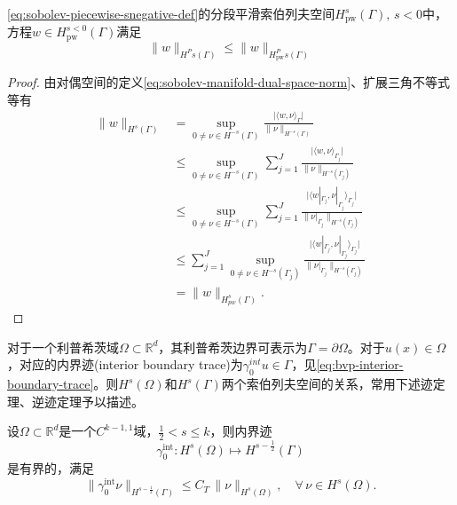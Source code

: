 \begin{lemma}
  \eqref{eq:sobolev-piecewise-snegative-def}的分段平滑索伯列夫空间$H^{s}_{\text{pw}}(\Gamma), \, s<0$中，方程$w \in H^{s<0}_{\text{pw}}(\Gamma)$满足
  \begin{equation*}
    \big\| w \big\|_{H^P{s}(\Gamma)} \le \big\| w \big\|_{H^P_{\text{pw}}{s}(\Gamma)}
  \end{equation*}
\end{lemma}
\begin{proof}
  由对偶空间的定义\eqref{eq:sobolev-manifold-dual-space-norm}、扩展三角不等式等有
  \begin{equation*}
    \begin{split}
      \big\| w \big\|_{H^s(\Gamma)} &=
      \sup_{0 \neq \nu \in H^{-s} (\Gamma)}
      \frac{
      \big| \langle w,\nu\rangle_{\Gamma} \big|
      }{
      \big\| \nu \big\|_{H^{-s}(\Gamma)}
      } \\
      & \le \sup_{0 \neq \nu \in H^{-s} (\Gamma)}
      \sum_{j=1}^{J}
      \frac{
      \big| \langle w,\nu\rangle_{\Gamma_j} \big|
      }{
      \big\| \nu \big\|_{H^{-s}(\Gamma_j)}
      } \\
      &\le  \sup_{0 \neq \nu \in H^{-s} (\Gamma)}
      \sum_{j=1}^{J}
      \frac{
      \big| \langle w|_{\Gamma_j},\nu|_{\Gamma_j} \rangle_{\Gamma_j} \big|
      }{
      \big\| \nu|_{\Gamma_j} \big\|_{H^{-s}(\Gamma_j)}
      } \\
      &\le  \sum_{j=1}^{J}
      \sup_{0 \neq \nu \in H^{-s} (\Gamma_j)}
      \frac{
      \big| \langle w|_{\Gamma_j},\nu|_{\Gamma_j} \rangle_{\Gamma_j} \big|
      }{
      \big\| \nu|_{\Gamma_j} \big\|_{H^{-s}(\Gamma_j)}
      } \\
      &= \big\| w \big\|_{H^{s}_{pw}(\Gamma)}.
    \end{split}
  \end{equation*}
\end{proof}

对于一个利普希茨域$\Omega \subset \mathbb{R}^d$，其利普希茨边界可表示为$\Gamma = \partial \Omega$。对于$u(x) \in \Omega$，对应的内界迹(interior boundary trace)为$\gamma_0^{int} u \in \Gamma$，见\eqref{eq:bvp-interior-boundary-trace}。则$H^s(\Omega)$和$H^s(\Gamma)$两个索伯列夫空间的关系，常用下述迹定理、逆迹定理予以描述。
\begin{theorem}[索伯列夫空间的迹定理]
  \label{theorem:sobolev-manifold-trace-theorem}
  设$\Omega \subset \mathbb{R}^d$是一个$C^{k-1,1}$域，$\frac{1}{2} < s \le k$，则内界迹
  \begin{equation*}
    \gamma_0^{\text{int}} : H^s(\Omega) \mapsto H^{s - \frac{1}{2}}(\Gamma)
  \end{equation*}
  是有界的，满足
  \begin{equation*}
    \big\| \gamma_0^{\text{int}} \nu \big\|_{H^{s-\frac{1}{2}}(\Gamma)} \le C_T \, \big\| \nu \big\|_{H^{s}(\Omega)}, \quad \forall \, \nu \in H^{s}(\Omega).
  \end{equation*}
\end{theorem}

